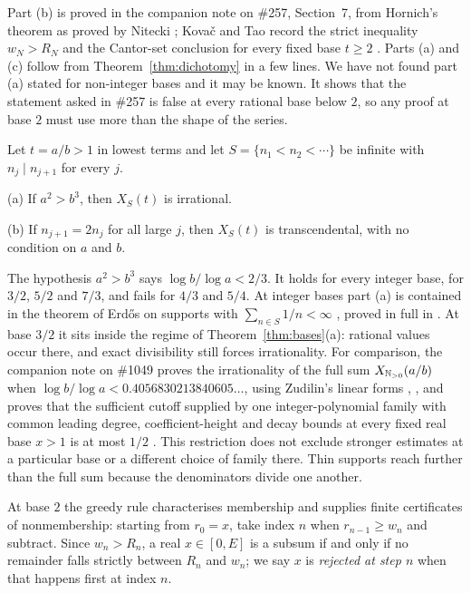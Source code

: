 \documentclass[11pt]{article}
\begin{document}
Part (b) is proved in the companion note on \#257, Section~7, from Hornich's
theorem as proved by Nitecki \cite{plectis257,hornich1941,nitecki2013}; Kova\v{c}
and Tao record the strict inequality $w_N>R_N$ and the Cantor-set conclusion for
every fixed base $t\ge2$ \cite[Remark~4.1]{kovactao2024}.  Parts (a) and (c) follow
from Theorem~\ref{thm:dichotomy} in a few lines.  We have not found part (a)
stated for non-integer bases and it may be known.  It shows that the statement
asked in \#257 is false at every rational base below $2$, so any proof at base
$2$ must use more than the shape of the series.

\begin{theorem}\label{thm:chains}
Let $t=a/b>1$ in lowest terms and let $S=\{n_1<n_2<\cdots\}$ be infinite with
$n_j\mid n_{j+1}$ for every $j$.

\textup{(a)} If $a^2>b^3$, then $X_S(t)$ is irrational.

\textup{(b)} If $n_{j+1}=2n_j$ for all large $j$, then $X_S(t)$ is
transcendental, with no condition on $a$ and $b$.
\end{theorem}

The hypothesis $a^2>b^3$ says $\log b/\log a<2/3$.  It holds for every integer
base, for $3/2$, $5/2$ and $7/3$, and fails for $4/3$ and $5/4$.  At integer
bases part (a) is contained in the theorem of Erd\H{o}s on supports with
$\sum_{n\in S}1/n<\infty$ \cite{erdos1968}, proved in full in
\cite[Theorem~2]{plectis257}.  At base $3/2$ it sits inside the regime of
Theorem~\ref{thm:bases}(a): rational values occur there, and exact divisibility
still forces irrationality.  For comparison, the companion note on \#1049 proves the irrationality of the
full sum $X_{\mathbb{N}_{>0}}(a/b)$ when $\log b/\log a<0.4056830213840605\ldots$, using Zudilin's
linear forms \cite[Theorem~1]{plectis1049}, \cite{zudilin2004}, and proves that
the sufficient cutoff supplied by one integer-polynomial family with common
leading degree, coefficient-height and decay bounds at every fixed real base
$x>1$ is at most $1/2$ \cite[Theorem~5]{plectis1049}.  This restriction does not
exclude stronger estimates at a particular base or a different choice of
family there.  Thin supports reach further than the full sum
because the denominators divide one another.

At base $2$ the greedy rule characterises membership and supplies finite
certificates of nonmembership: starting from $r_0=x$, take
index $n$ when $r_{n-1}\ge w_n$ and subtract.  Since $w_n>R_n$, a real
$x\in[0,E]$ is a subsum if and only if no remainder falls strictly between
$R_n$ and $w_n$; we say $x$ is \emph{rejected at step $n$} when that happens
first at index $n$.
\end{document}
